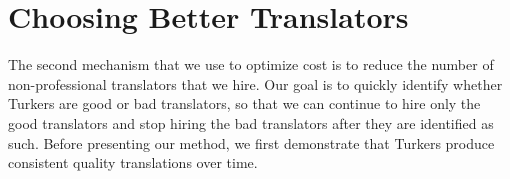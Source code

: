 \documentclass[11pt,letterpaper]{article}
\begin{document}


\section{Choosing Better Translators}

The second mechanism that we use to optimize cost is to reduce the number of non-professional translators that we hire.  Our goal is to quickly identify whether Turkers are good or bad translators, so that we can continue to hire only the good translators and stop hiring the bad translators after they are identified as such. 
%
Before presenting our method, we first demonstrate that Turkers produce consistent quality translations over time.
\end{document}
